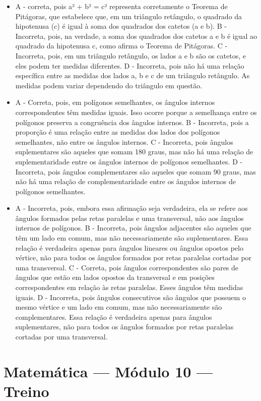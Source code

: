 \begin{itemize}
\item A - correta, pois a² + b² = c² representa corretamente o Teorema de
Pitágoras, que estabelece que, em um triângulo retângulo, o quadrado da
hipotenusa (c) é igual à soma dos quadrados dos catetos (a e b).
B - Incorreta, pois, na verdade, a soma dos quadrados dos catetos a e b
é igual ao quadrado da hipotenusa c, como afirma o Teorema de Pitágoras.
C - Incorreta, pois, em um triângulo retângulo, os lados a e b são os
catetos, e eles podem ter medidas diferentes.
D - Incorreta, pois não há uma relação específica entre as medidas dos
lados a, b e c de um triângulo retângulo. As medidas podem variar
dependendo do triângulo em questão.
\item A - Correta, pois, em polígonos semelhantes, os ângulos internos
correspondentes têm medidas iguais. Isso ocorre porque a semelhança
entre os polígonos preserva a congruência dos ângulos internos.
B - Incorreta, pois a proporção é uma relação entre as medidas dos lados
dos polígonos semelhantes, não entre os ângulos internos.
C - Incorreta, pois ângulos suplementares são aqueles que somam 180
graus, mas não há uma relação de suplementaridade entre os ângulos
internos de polígonos semelhantes.
D - Incorreta, pois ângulos complementares são aqueles que somam 90
graus, mas não há uma relação de complementaridade entre os ângulos
internos de polígonos semelhantes.
\item A - Incorreta, pois, embora essa afirmação seja verdadeira, ela se
refere aos ângulos formados pelas retas paralelas e uma transversal, não
aos ângulos internos de polígonos.
B - Incorreta, pois ângulos adjacentes são aqueles que têm um lado em
comum, mas não necessariamente são suplementares. Essa relação é
verdadeira apenas para ângulos lineares ou ângulos opostos pelo vértice,
não para todos os ângulos formados por retas paralelas cortadas por uma
transversal.
C - Correta, pois ângulos correspondentes são pares de ângulos que estão
em lados opostos da transversal e em posições correspondentes em relação
às retas paralelas. Esses ângulos têm medidas iguais.
D - Incorreta, pois ângulos consecutivos são ângulos que possuem o mesmo
vértice e um lado em comum, mas não necessariamente são complementares.
Essa relação é verdadeira apenas para ângulos suplementares, não para
todos os ângulos formados por retas paralelas cortadas por uma
transversal.
\end{itemize}

\section*{Matemática — Módulo 10 — Treino}


